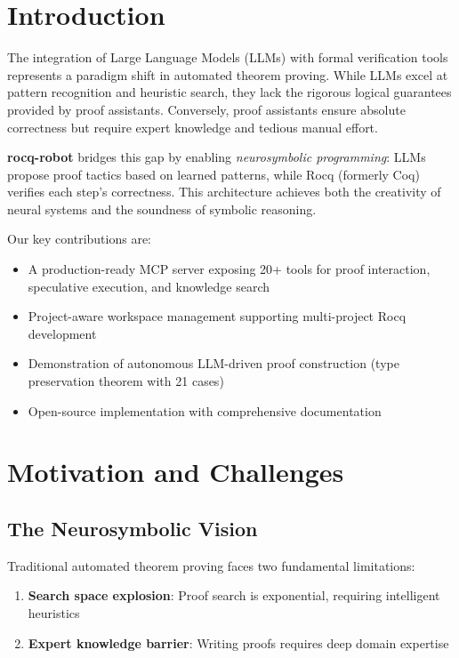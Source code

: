 \documentclass[sigconf,screen,nonacm]{acmart}
\begin{document}
\section{Introduction}

The integration of Large Language Models (LLMs) with formal verification tools represents a paradigm shift in automated theorem proving. While LLMs excel at pattern recognition and heuristic search, they lack the rigorous logical guarantees provided by proof assistants. Conversely, proof assistants ensure absolute correctness but require expert knowledge and tedious manual effort.

\textbf{rocq-robot} bridges this gap by enabling \emph{neurosymbolic programming}: LLMs propose proof tactics based on learned patterns, while Rocq (formerly Coq)~\cite{coq} verifies each step's correctness. This architecture achieves both the creativity of neural systems and the soundness of symbolic reasoning.

Our key contributions are:
\begin{itemize}
\item A production-ready MCP server exposing 20+ tools for proof interaction, speculative execution, and knowledge search
\item Project-aware workspace management supporting multi-project Rocq development
\item Demonstration of autonomous LLM-driven proof construction (type preservation theorem with 21 cases)
\item Open-source implementation with comprehensive documentation
\end{itemize}

\section{Motivation and Challenges}

\subsection{The Neurosymbolic Vision}

Traditional automated theorem proving faces two fundamental limitations:
\begin{enumerate}
\item \textbf{Search space explosion}: Proof search is exponential, requiring intelligent heuristics
\item \textbf{Expert knowledge barrier}: Writing proofs requires deep domain expertise
\end{enumerate}
\end{document}
